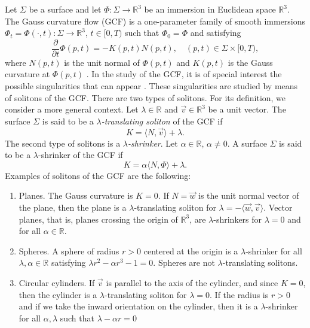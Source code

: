 \documentclass[a4paper,12pt]{amsart}
\theoremstyle{definition}
\def\r{\mathbb R}
\begin{document}
 Let $\Sigma$ be a surface and let $\Phi:\Sigma\to\r^3$ be an    immersion  in Euclidean space $\r^3$. The Gauss curvature flow (GCF) is a one-parameter family of smooth   immersions $\Phi_t=\Phi(\cdot,t)\colon\Sigma\to \r^3$, $t\in [0,T)$ such that $\Phi_0=\Phi$ and satisfying   
$$\frac{\partial}{\partial t}\Phi(p,t)=-K(p,t)  N(p,t),\quad (p,t)\in \Sigma\times [0,T),$$
where   $N(p,t)$ is the unit normal of $\Phi(p,t)$ and $K(p,t)$ is the Gauss curvature at $\Phi(p,t)$ \cite{an1,ch,ur}.  In the study of the GCF, it is of special interest  the possible singularities that can appear \cite{an2,br}. These singularities are studied by means of solitons of the GCF. There are two   types of solitons. For its definition,  we consider a more general context. Let  $\lambda\in\r$ and $\vec{v}\in\r^3$  be a unit vector. The surface $\Sigma$ is said to be a {\it $\lambda$-translating soliton} of the  GCF if  
\begin{equation}\label{eq1}
K=\langle N,\vec{v}\rangle+\lambda.
\end{equation} 
The second type of solitons is  a {\it $\lambda$-shrinker}. Let $\alpha\in\r$, $\alpha\not=0$. A surface $\Sigma$ is said to be a $\lambda$-shrinker of the GCF if 
\begin{equation}\label{eq2}
K=\alpha\langle N,\Phi\rangle+\lambda.
\end{equation} 
  Examples of  solitons of the GCF are the following:
 \begin{enumerate}
 \item Planes. The   Gauss curvature is  $K=0$. If $N=\vec{w}$ is the unit normal vector of the plane, then the plane is a $\lambda$-translating soliton for $\lambda=-\langle\vec{w},\vec{v}\rangle$. Vector planes, that is, planes crossing the origin of $\r^3$, are   $\lambda$-shrinkers for $\lambda=0$ and for all $\alpha\in\r$.
 \item Spheres. A sphere of radius $r>0$ centered at the origin  is a $\lambda$-shrinker for all $\lambda,\alpha\in\r$ satisfying $\lambda r^2-\alpha r^3-1=0$.   Spheres are not $\lambda$-translating solitons.
 \item Circular cylinders. If   $\vec{v}$ is parallel to the axis of the cylinder, and since $K=0$, then the cylinder is a $\lambda$-translating soliton  for $\lambda=0$. If the radius is $r>0$ and if we take the inward orientation on the cylinder, then it is a $\lambda$-shrinker for all $\alpha,\lambda$ such that $\lambda-\alpha r=0$
  \end{enumerate}
\end{document}
